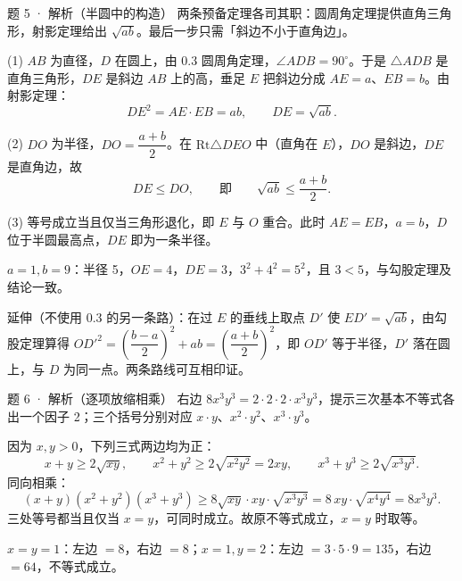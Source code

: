 \begin{solution}{题 5 · 解析（半圆中的构造）}
\think 两条预备定理各司其职：圆周角定理提供直角三角形，射影定理给出 $\sqrt{ab}$。最后一步只需「斜边不小于直角边」。

\solve (1) $AB$ 为直径，$D$ 在圆上，由 0.3 圆周角定理，$\angle ADB=90^\circ$。于是 $\triangle ADB$ 是直角三角形，$DE$ 是斜边 $AB$ 上的高，垂足 $E$ 把斜边分成 $AE=a$、$EB=b$。由射影定理：
\[
DE^2=AE\cdot EB=ab,\qquad DE=\sqrt{ab}.
\]

(2) $DO$ 为半径，$DO=\dfrac{a+b}{2}$。在 $\mathrm{Rt}\triangle DEO$ 中（直角在 $E$），$DO$ 是斜边，$DE$ 是直角边，故
\[
DE\le DO,\qquad\text{即}\qquad \sqrt{ab}\le\frac{a+b}{2}.
\]

(3) 等号成立当且仅当三角形退化，即 $E$ 与 $O$ 重合。此时 $AE=EB$，$a=b$，$D$ 位于半圆最高点，$DE$ 即为一条半径。

\checkup $a=1,b=9$：半径 5，$OE=4$，$DE=3$，$3^2+4^2=5^2$，且 $3<5$，与勾股定理及结论一致。


\begin{remark*}
延伸（不使用 0.3 的另一条路）：在过 $E$ 的垂线上取点 $D'$ 使 $ED'=\sqrt{ab}$，由勾股定理算得 $OD'^2=\left(\dfrac{b-a}{2}\right)^2+ab=\left(\dfrac{a+b}{2}\right)^2$，即 $OD'$ 等于半径，$D'$ 落在圆上，与 $D$ 为同一点。两条路线可互相印证。
\end{remark*}
\end{solution}

\begin{solution}{题 6 · 解析（逐项放缩相乘）}
\think 右边 $8x^3y^3=2\cdot 2\cdot 2\cdot x^3y^3$，提示三次基本不等式各出一个因子 2；三个括号分别对应 $x\cdot y$、$x^2\cdot y^2$、$x^3\cdot y^3$。

\solve 因为 $x,y>0$，下列三式两边均为正：
\[
x+y\ge 2\sqrt{xy},\qquad x^2+y^2\ge 2\sqrt{x^2y^2}=2xy,\qquad x^3+y^3\ge 2\sqrt{x^3y^3}.
\]
同向相乘：
\[
(x+y)(x^2+y^2)(x^3+y^3)\ge 8\sqrt{xy}\cdot xy\cdot\sqrt{x^3y^3}=8\,xy\cdot\sqrt{x^4y^4}=8x^3y^3.
\]
三处等号都当且仅当 $x=y$，可同时成立。故原不等式成立，$x=y$ 时取等。

\checkup $x=y=1$：左边 $=8$，右边 $=8$；$x=1,y=2$：左边 $=3\cdot5\cdot9=135$，右边 $=64$，不等式成立。

\end{solution}

